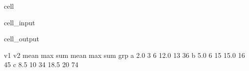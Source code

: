 \documentclass[letterpaper,10pt,english]{jupyterBook}
\begin{document}
\begin{sphinxuseclass}{cell}\begin{sphinxVerbatimInput}

\begin{sphinxuseclass}{cell_input}
\begin{sphinxVerbatim}[commandchars=\\\{\}]
\PYG{p}{[}\PYG{p}{[}\PYG{p}{]}\PYG{p}{]}\PYG{p}{[}\PYG{p}{]}
\end{sphinxVerbatim}

\end{sphinxuseclass}\end{sphinxVerbatimInput}
\begin{sphinxVerbatimOutput}

\begin{sphinxuseclass}{cell_output}
\begin{sphinxVerbatim}[commandchars=\\\{\}]
      v1            v2        
    mean max sum  mean max sum
grp                           
a    2.0   3   6  12.0  13  36
b    5.0   6  15  15.0  16  45
c    8.5  10  34  18.5  20  74
\end{sphinxVerbatim}

\end{sphinxuseclass}\end{sphinxVerbatimOutput}

\end{sphinxuseclass}
\end{document}
